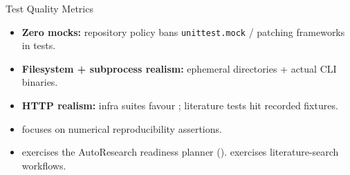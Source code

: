 \documentclass[
  ignorenonframetext,
]{beamer}
\begin{document}
\begin{frame}{Test Quality Metrics}
\protect{}\label{test-quality-metrics}
\begin{itemize}
\item
  \textbf{Zero mocks:} repository policy bans \texttt{unittest.mock} /
  patching frameworks in tests.
\item
  \textbf{Filesystem + subprocess realism:} ephemeral directories +
  actual CLI binaries.
\item
  \textbf{HTTP realism:} infra suites favour ;
  literature tests hit recorded fixtures.
\item
  \textbf{} focuses on numerical
  reproducibility assertions.
\item
  \textbf{} exercises the
  AutoResearch readiness planner
  ().
  \textbf{} exercises
  literature-search workflows.
\end{itemize}
\end{frame}
\end{document}
